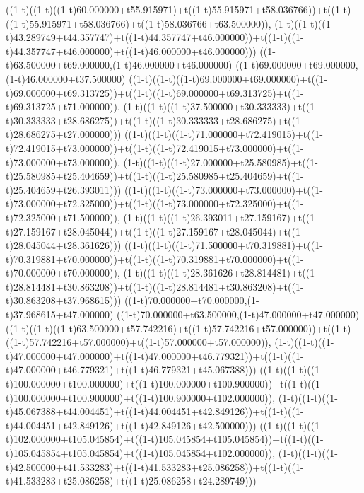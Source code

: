 ((1-t)((1-t)((1-t)60.000000+t55.915971)+t((1-t)55.915971+t58.036766))+t((1-t)((1-t)55.915971+t58.036766)+t((1-t)58.036766+t63.500000)),                                     (1-t)((1-t)((1-t)43.289749+t44.357747)+t((1-t)44.357747+t46.000000))+t((1-t)((1-t)44.357747+t46.000000)+t((1-t)46.000000+t46.000000)))
((1-t)63.500000+t69.000000,(1-t)46.000000+t46.000000)
((1-t)69.000000+t69.000000,(1-t)46.000000+t37.500000)
((1-t)((1-t)((1-t)69.000000+t69.000000)+t((1-t)69.000000+t69.313725))+t((1-t)((1-t)69.000000+t69.313725)+t((1-t)69.313725+t71.000000)),                                     (1-t)((1-t)((1-t)37.500000+t30.333333)+t((1-t)30.333333+t28.686275))+t((1-t)((1-t)30.333333+t28.686275)+t((1-t)28.686275+t27.000000)))
((1-t)((1-t)((1-t)71.000000+t72.419015)+t((1-t)72.419015+t73.000000))+t((1-t)((1-t)72.419015+t73.000000)+t((1-t)73.000000+t73.000000)),                                     (1-t)((1-t)((1-t)27.000000+t25.580985)+t((1-t)25.580985+t25.404659))+t((1-t)((1-t)25.580985+t25.404659)+t((1-t)25.404659+t26.393011)))
((1-t)((1-t)((1-t)73.000000+t73.000000)+t((1-t)73.000000+t72.325000))+t((1-t)((1-t)73.000000+t72.325000)+t((1-t)72.325000+t71.500000)),                                     (1-t)((1-t)((1-t)26.393011+t27.159167)+t((1-t)27.159167+t28.045044))+t((1-t)((1-t)27.159167+t28.045044)+t((1-t)28.045044+t28.361626)))
((1-t)((1-t)((1-t)71.500000+t70.319881)+t((1-t)70.319881+t70.000000))+t((1-t)((1-t)70.319881+t70.000000)+t((1-t)70.000000+t70.000000)),                                     (1-t)((1-t)((1-t)28.361626+t28.814481)+t((1-t)28.814481+t30.863208))+t((1-t)((1-t)28.814481+t30.863208)+t((1-t)30.863208+t37.968615)))
((1-t)70.000000+t70.000000,(1-t)37.968615+t47.000000)
((1-t)70.000000+t63.500000,(1-t)47.000000+t47.000000)
((1-t)((1-t)((1-t)63.500000+t57.742216)+t((1-t)57.742216+t57.000000))+t((1-t)((1-t)57.742216+t57.000000)+t((1-t)57.000000+t57.000000)),                                     (1-t)((1-t)((1-t)47.000000+t47.000000)+t((1-t)47.000000+t46.779321))+t((1-t)((1-t)47.000000+t46.779321)+t((1-t)46.779321+t45.067388)))
((1-t)((1-t)((1-t)100.000000+t100.000000)+t((1-t)100.000000+t100.900000))+t((1-t)((1-t)100.000000+t100.900000)+t((1-t)100.900000+t102.000000)),                                     (1-t)((1-t)((1-t)45.067388+t44.004451)+t((1-t)44.004451+t42.849126))+t((1-t)((1-t)44.004451+t42.849126)+t((1-t)42.849126+t42.500000)))
((1-t)((1-t)((1-t)102.000000+t105.045854)+t((1-t)105.045854+t105.045854))+t((1-t)((1-t)105.045854+t105.045854)+t((1-t)105.045854+t102.000000)),                                     (1-t)((1-t)((1-t)42.500000+t41.533283)+t((1-t)41.533283+t25.086258))+t((1-t)((1-t)41.533283+t25.086258)+t((1-t)25.086258+t24.289749)))
